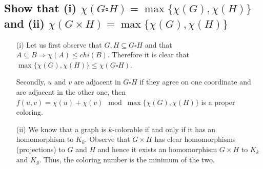 \subsection[Matchings 9]{Show that (i) $\chi(G\square H) = \max\{\chi(G),\chi(H)\}$ and (ii) $\chi(G\times H) = \max\{\chi(G),\chi(H)\}$}

\begin{itemize}
    \item[(i)] Let us first observe that $G, H \subseteq G \square H$ and that $A \subseteq B \Rightarrow \chi(A) \leq chi(B)$.
        Therefore it is clear that $\max\{\chi(G), \chi(H)\} \leq \chi(G \square H)$.

        Secondly, $u$ and $v$ are adjacent in $G \square H$ if they agree on one coordinate and are adjacent in the other one, then $f(u,v) = \chi(u) + \chi(v) \mod \max\{\chi(G), \chi(H)\}$ is a proper coloring.
    \item[(ii)] We know that a graph is $k$-colorable if and only if it has an homomorphism to $K_k$. 
        Observe that $G \times H$ has clear homomorphisms (projections) to $G$ and $H$ and hence it exists an homomorphism $G \times H$ to $K_k$ and $K_g$.
        Thus, the coloring number is the minimum of the two.
\end{itemize}
